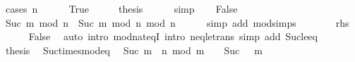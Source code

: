 \begin{isabellebody}
%
\isadelimproof
%
\endisadelimproof
%
\isatagproof
{}\isamarkupfalse%
\ {\isacharparenleft}{\kern0pt}cases\ {\isachardoublequoteopen}n\ {\isacharequal}{\kern0pt}\ {}{\isachardoublequoteclose}{\isacharparenright}{\kern0pt}\isanewline
\ \ \isamarkupfalse%
\ True\isanewline
\ \ \isamarkupfalse%
\ \isamarkupfalse%
\ {\isacharquery}{\kern0pt}thesis\isanewline
\ \ \ \ \isamarkupfalse%
\ simp\isanewline
{}\isamarkupfalse%
\isanewline
\ \ \isamarkupfalse%
\ False\isanewline
\ \ \isamarkupfalse%
\ {\isachardoublequoteopen}Suc\ m\ mod\ n\ {\isacharequal}{\kern0pt}\ Suc\ {\isacharparenleft}{\kern0pt}m\ mod\ n{\isacharparenright}{\kern0pt}\ mod\ n{\isachardoublequoteclose}\isanewline
\ \ \ \ \isamarkupfalse%
\ {\isacharparenleft}{\kern0pt}simp\ add{\isacharcolon}{\kern0pt}\ mod{\isacharunderscore}{\kern0pt}simps{\isacharparenright}{\kern0pt}\isanewline
\ \ \isamarkupfalse%
\ \isamarkupfalse%
\ {\isachardoublequoteopen}{\isasymdots}\ {\isacharequal}{\kern0pt}\ {\isacharquery}{\kern0pt}rhs{\isachardoublequoteclose}\isanewline
\ \ \ \ \isamarkupfalse%
\ False\ \isamarkupfalse%
\ {\isacharparenleft}{\kern0pt}auto\ intro{\isacharbang}{\kern0pt}{\isacharcolon}{\kern0pt}\ mod{\isacharunderscore}{\kern0pt}nat{\isacharunderscore}{\kern0pt}eqI\ intro{\isacharcolon}{\kern0pt}\ neq{\isacharunderscore}{\kern0pt}le{\isacharunderscore}{\kern0pt}trans\ simp\ add{\isacharcolon}{\kern0pt}\ Suc{\isacharunderscore}{\kern0pt}le{\isacharunderscore}{\kern0pt}eq{\isacharparenright}{\kern0pt}\isanewline
\ \ \isamarkupfalse%
\ \isamarkupfalse%
\ {\isacharquery}{\kern0pt}thesis\ \isacommand{{\isachardot}{\kern0pt}}\isamarkupfalse%
\isanewline
{}\isamarkupfalse%
%
\endisatagproof
{\isafoldproof}%
%
\isadelimproof
\isanewline
%
\endisadelimproof
\isanewline
{}\isamarkupfalse%
\ Suc{\isacharunderscore}{\kern0pt}times{\isacharunderscore}{\kern0pt}mod{\isacharunderscore}{\kern0pt}eq{\isacharcolon}{\kern0pt}\isanewline
\ \ {\isachardoublequoteopen}Suc\ {\isacharparenleft}{\kern0pt}m\ {\isacharasterisk}{\kern0pt}\ n{\isacharparenright}{\kern0pt}\ mod\ m\ {\isacharequal}{\kern0pt}\ {}{\isachardoublequoteclose}\ \ {\isachardoublequoteopen}Suc\ {}\ {\isacharless}{\kern0pt}\ m{\isachardoublequoteclose}\isanewline
%
\isadelimproof
\ \ %
\endisadelimproof
%
\isatagproof
{}\isamarkupfalse%

\end{isabellebody}
